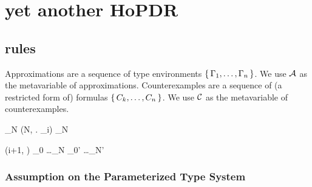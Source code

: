 \documentclass[acmsmall,review,anonymous]{acmart}\settopmatter{printfolios=true,printccs=false,printacmref=false}
\begin{document}
\section{yet another HoPDR}

\subsection{rules}

Approximations are a sequence of type environments \( \{\, \Gamma_1, \dots, \Gamma_n \, \} \). We use \( \mathcal{A} \) as the metavariable of approximations.
Counterexamples are a sequence of (a restricted form of) formulas \( \{\, C_k, \dots, C_n \, \} \). We use \( \mathcal{C} \) as the metavariable of counterexamples.

\infrule[Initialize]{
}{
\Tr \epsilon \pdrmid \TE{\stE}
}



 {
\epsilon \pdrmid \aprx \cdot \tenv_N
\Tr (N, \forall {}.\: \formula_i) \pdrmid \aprx \cdot \tenv_N
}

 {
(i+1, \cex) \cdot \cexs \pdrmid \tenv_0 \dots \tenv_N 
\Tr \cexs \pdrmid \tenv_0' \dots \tenv_N'
}


\subsubsection{Assumption on the Parameterized Type System}
\end{document}
